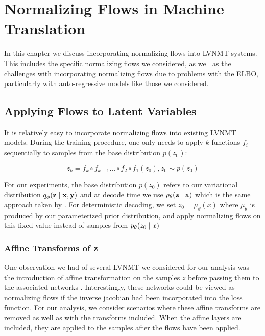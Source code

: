 \chapter{Normalizing Flows in Machine Translation}


In this chapter we discuss incorporating normalizing flows into \ac{LVNMT} systems. This includes the specific normalizing flows we considered, as well as the challenges with incorporating normalizing flows due to problems with the \ac{ELBO}, particularly with auto-regressive models like those we considered.

\section{Applying Flows to Latent Variables}


It is relatively easy to incorporate normalizing flows into existing LVNMT models. During the training procedure, one only needs to apply $k$ functions $f_{i}$ sequentially to samples from the base distribution $p(z_{0})$: 

\begin{equation}
z_{k} = f_{k} \circ f_{k-1} ... \circ f_{2} \circ f_{1}(z_{0}) , z_{0} \sim p(z_{0})
\end{equation}

For our experiments, the base distribution $p(z_{0})$ refers to our variational distribution $q_{\phi}(\textbf{z} \; | \;{\textbf{x}, \textbf{y}})$ and at decode time we use $p_{\theta}(\textbf{z} \; | \;{\textbf{x}})$ which is the same approach taken by \citet{Zhang2016VNMT}. For deterministic decoding, we set $z_{0} = \mu_{\theta}(x)$ where $\mu_{\theta}$ is produced by our parameterized prior distribution, and apply normalizing flows on this fixed value instead of samples from $p_{\theta}(z_{0} \; | \;{x})$

\subsection{Affine Transforms of z}

One observation we had of several \ac{LVNMT} we considered for our analysis was the introduction of affine transformation on the samples $z$ before passing them to the associated networks \cite{eikema2018AEVNMT,Zhang2016VNMT}. Interestingly, these networks could be viewed as normalizing flows if the inverse jacobian had been incorporated into the loss function. For our analysis, we consider scenarios where these affine transforms are removed as well as with the transforms included. When the affine layers are included, they are applied to the samples after the flows have been applied. 

